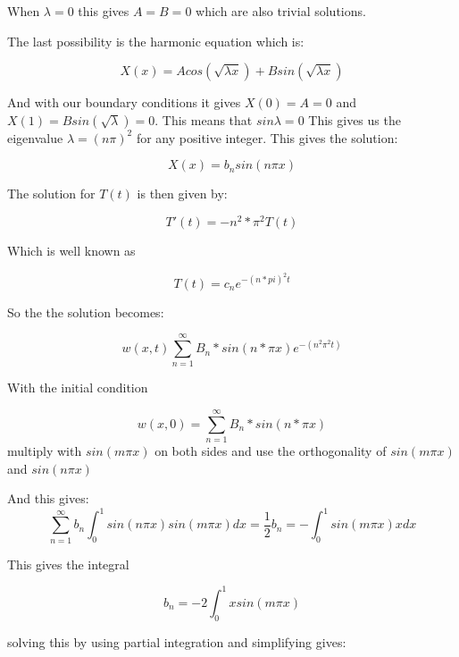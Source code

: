 \documentclass[a4paper,10pt]{article}
\begin{document}
When $\lambda = 0 $ this gives $A=B=0$ which are also trivial solutions.

The last possibility is the harmonic equation which is:

\begin{equation}
  X(x) = Acos(\sqrt{\lambda x}) + Bsin(\sqrt{\lambda x})
\end{equation}

And with our boundary conditions it gives $X(0) = A = 0$ and $X(1) = Bsin(\sqrt{\lambda}) = 0$.
This means that $sin\lambda = 0$ This gives us the eigenvalue $\lambda = (n\pi)^2$ for any positive integer.
This gives the solution:

\begin{equation}
 X(x) = b_nsin(n\pi x)
\end{equation}

The solution for $T(t)$ is then given by:

\begin{equation}
 T'(t) = -n^2*\pi ^2 T(t)
\end{equation}

Which is well known as 

\begin{equation}
 T(t) = c_ne^{-(n*pi)^2t}
\end{equation}

So the the solution becomes:

\begin{equation}
 w(x,t) \sum_{n=1}^{\infty} B_n*sin(n*\pi x)e^{-(n^2\pi^2t)}
 \end{equation}
 
With the initial condition

\begin{equation}
 w(x,0) = \sum_{n=1}^{\infty} B_n*sin(n*\pi x)
\end{equation}
multiply with $sin(m\pi x)$ on both sides and use the orthogonality of $sin(m\pi x)$  and $sin(n\pi x)$

And this gives:
\begin{equation}
 \sum_{n=1}^{\infty} b_n \int_0^1 sin(n\pi x)sin(m\pi x)dx = \frac{1}{2}b_n = -\int_0^1 sin(m\pi x)x dx
\end{equation}

This gives the integral

\begin{equation}
 b_n = -2\int_0^1 xsin(m\pi x)
\end{equation}

solving this by using partial integration and simplifying gives:
\end{document}
